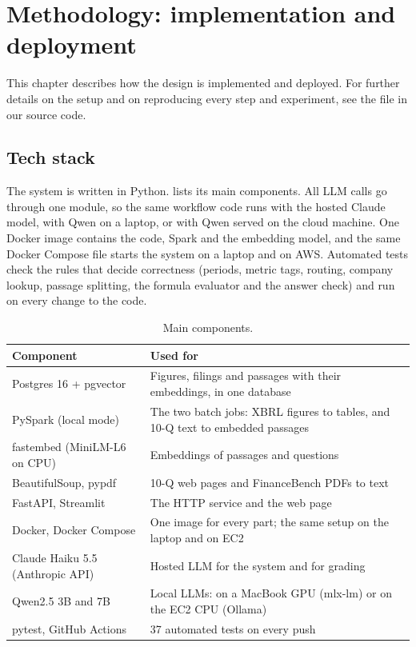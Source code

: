\section{Methodology: implementation and deployment}
\label{sec:implementation}

This chapter describes how the design is implemented and deployed. For further details on the setup
and on reproducing every step and experiment, see the file
\href{https://github.com/Cloud-Computing-group-10/financial-agent-project/blob/feature/cloud-app/REPRODUCE.md}{}
in our source code.

\subsection{Tech stack}

The system is written in Python.  lists its main components. All LLM calls go through
one module, so the same workflow code runs with the hosted Claude model, with Qwen on a laptop, or
with Qwen served on the cloud machine. One Docker image contains the code, Spark and the embedding
model, and the same Docker Compose file starts the system on a laptop and on AWS. Automated tests
check the rules that decide correctness (periods, metric tags, routing, company lookup, passage
splitting, the formula evaluator and the answer check) and run on every change to the code.

\begin{table}[ht]
\centering\small
\begin{tabularx}{\linewidth}{lX}
\toprule
Component & Used for \\
\midrule
Postgres 16 + pgvector & Figures, filings and passages with their embeddings, in one database \\
PySpark (local mode) & The two batch jobs: XBRL figures to tables, and 10-Q text to embedded passages \\
fastembed (MiniLM-L6 on CPU) & Embeddings of passages and questions \\
BeautifulSoup, pypdf & 10-Q web pages and FinanceBench PDFs to text \\
FastAPI, Streamlit & The HTTP service and the web page \\
Docker, Docker Compose & One image for every part; the same setup on the laptop and on EC2 \\
Claude Haiku 5.5 (Anthropic API) & Hosted LLM for the system and for grading \\
Qwen2.5 3B and 7B & Local LLMs: on a MacBook GPU (mlx-lm) or on the EC2 CPU (Ollama) \\
pytest, GitHub Actions & 37 automated tests on every push \\
\bottomrule
\end{tabularx}
\caption{Main components.}
\label{tab:stack}
\end{table}

